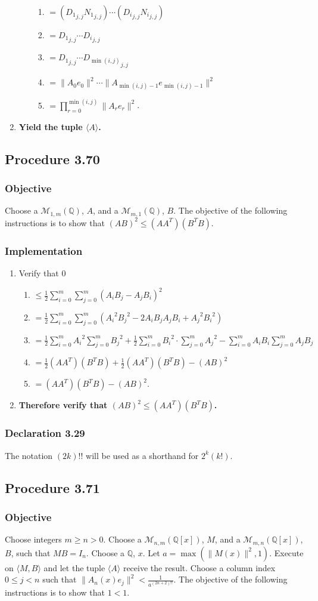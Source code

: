 \documentclass[twocolumn]{article}
\newcommand{\declaration}[1]{\subsubsection*{Declaration #1}\label{sec:declaration #1}}
\newcommand{\procedure}[2][]{\subsection*{Procedure #2 \ifthenelse{\equal{#1}{}}{}{(#1)}}\label{sec:procedure #2}}
\newcommand{\objective}{\subsubsection*{Objective}}
\newcommand{\implementation}{\subsubsection*{Implementation}}
\newcommand{\procedurehr}[2][]{\hyperref[sec:procedure #2]{\ifthenelse{\equal{#1}{}}{procedure #2}{#1}}}
\begin{document}
\begin{enumerate}
\begin{enumerate}
\begin{enumerate}
							\item $=({D_1}_{j,j}{N_1}_{j,j})\cdots ({D_i}_{j,j}{N_i}_{j,j})$
							\item $={D_1}_{j,j}\cdots {D_i}_{j,j}$
							\item $={D_1}_{j,j}\cdots {D_{\min(i,j)}}_{j,j}$
							\item $=\lVert A_0e_0\rVert^2\cdots\lVert A_{\min(i,j)-1}e_{\min(i,j)-1}\rVert^2$
							\item $=\prod_{r=0}^{\min(i,j)}\lVert A_re_{r}\rVert^2$.
						\end{enumerate}
					\end{enumerate}
					\item \textbf{Yield the tuple $\langle A\rangle$.}
				\end{enumerate}
		\procedure{3.70}
			\objective
				Choose a $\mathcal{M}_{1,m}(\mathbb{Q})$, $A$, and a $\mathcal{M}_{m,1}(\mathbb{Q})$, $B$. The objective of the following instructions is to show that $(AB)^2\le(AA^T)(B^TB)$.
			\implementation
				\begin{enumerate}
					\item Verify that $0$
					\begin{enumerate}
						\item $\le\frac{1}{2}\sum_{i=0}^m\sum_{j=0}^m (A_iB_j-A_jB_i)^2$
						\item $=\frac{1}{2}\sum_{i=0}^m\sum_{j=0}^m ({A_i}^2{B_j}^2-2A_iB_jA_jB_i+{A_j}^2{B_i}^2)$
						\item $=\frac{1}{2}\sum_{i=0}^m {A_i}^2\sum_{j=0}^m {B_j}^2+\frac{1}{2}\sum_{i=0}^m {B_i}^2\cdot\allowbreak\sum_{j=0}^m {A_j}^2-\sum_{i=0}^m A_iB_i\sum_{j=0}^m A_jB_j$
						\item $=\frac{1}{2}(AA^T)(B^TB)+\frac{1}{2}(AA^T)(B^TB)-(AB)^2$
						\item $=(AA^T)(B^TB)-(AB)^2$.
					\end{enumerate}
					\item \textbf{Therefore verify that $(AB)^2\le(AA^T)(B^TB)$.}
				\end{enumerate}
		\declaration{3.29}
			The notation $(2k)!!$ will be used as a shorthand for $2^k(k!)$.
		\procedure{3.71}
			\objective
				Choose integers $m\ge n>0$. Choose a $\mathcal{M}_{n,m}(\mathbb{Q}[x])$, $M$, and a $\mathcal{M}_{m,n}(\mathbb{Q}[x])$, $B$, such that $MB=I_n$. Choose a $\mathbb{Q}$, $x$. Let $a=\max(\lVert M(x)\rVert^2,1)$. Execute \procedurehr{3.69} on $\langle M,B\rangle$ and let the tuple $\langle A\rangle$ receive the result. Choose a column index $0\le j<n$ such that $\lVert A_n(x)e_j\rVert^2<\frac{1}{a^{(2n+2)!!}}$. The objective of the following instructions is to show that $1<1$.
\end{document}
